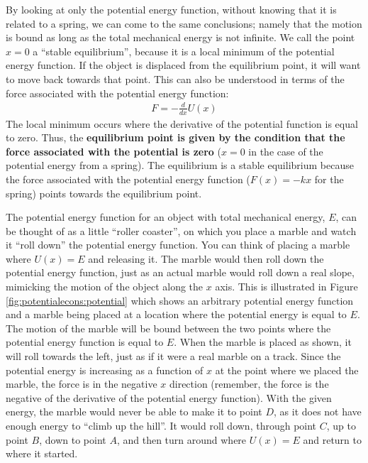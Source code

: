 By looking at only the potential energy function, without knowing that it is related to a spring, we can come to the same conclusions; namely that the motion is bound as long as the total mechanical energy is not infinite. We call the point $x=0$ a ``stable equilibrium'', because it is a local minimum of the potential energy function. If the object is displaced from the equilibrium point, it will want to move back towards that point. This can also be understood in terms of the force associated with the potential energy function:
\begin{align*}
F = -\frac{d}{dx}U(x)
\end{align*}
The local minimum occurs where the derivative of the potential function is equal to zero. Thus, the \textbf{equilibrium point is given by the condition that the force associated with the potential is zero} ($x=0$ in the case of the potential energy from a spring). The equilibrium is a stable equilibrium because the force associated with the potential energy function ($F(x)=-kx$ for the spring) points towards the equilibrium point.

The potential energy function for an object with total mechanical energy, $E$, can be thought of as a little ``roller coaster'', on which you place a marble and watch it ``roll down'' the potential energy function. You can think of placing a marble where $U(x)=E$ and releasing it. The marble would then roll down the potential energy function, just as an actual marble would roll down a real slope, mimicking the motion of the object along the $x$ axis. This is illustrated in Figure \ref{fig:potentialecons:potential} which shows an arbitrary potential energy function and a marble being placed at a location where the potential energy is equal to $E$.
The motion of the marble will be bound between the two points where the potential energy function is equal to $E$. When the marble is placed as shown, it will roll towards the left, just as if it were a real marble on a track. Since the potential energy is increasing as a function of $x$ at the point where we placed the marble, the force is in the negative $x$ direction (remember, the force is the negative of the derivative of the potential energy function). With the given energy, the marble would never be able to make it to point $D$, as it does not have enough energy to ``climb up the hill''. It would roll down, through point $C$, up to point $B$, down to point $A$, and then turn around where $U(x)=E$ and return to where it started. 

